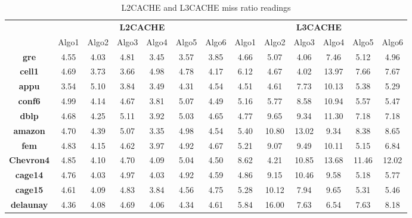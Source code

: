 \begin{table*}[th]
\small
\centering

\begin{tabular}{ c|c|c|c|c|c|c|c|c|c|c|c|c| }
  \cline{2-13}
&
\multicolumn{6}{c}{\textbf{L2CACHE}} &
  \multicolumn{6}{|c}{\textbf{L3CACHE}} \\
  \cline{2-13}
  \multicolumn{1}{c|}{} &
  Algo1 & Algo2 & Algo3 & Algo4 & Algo5 & Algo6 & Algo1 & Algo2 & Algo3 & Algo4 & Algo5 & Algo6\\\hline
  \hline
  \multicolumn{1}{|c|}{\textbf{gre}}
& 4.55 & 4.03 & 4.81 & 3.45 & 3.57 & 3.85 & 4.66 & 5.07 & 4.06 & 7.46 & 5.12 & 4.96 \\ \hline
  \hline
  \multicolumn{1}{|c|}{\textbf{cell1}}
& 4.69 & 3.73 & 3.66 & 4.98 & 4.78 & 4.17 & 6.12 & 4.67 & 4.02 & 13.97 & 7.66 & 7.67\\ \hline
  \hline
  \multicolumn{1}{|c|}{\textbf{appu}}
& 3.54 & 5.10 & 3.84 & 3.49 & 4.31 & 4.54 & 4.51 & 4.61 & 7.73 & 10.13 & 5.38 & 5.29\\ \hline
  \hline
\multicolumn{1}{|c|}{\textbf{conf6}}
& 4.99 & 4.14 & 4.67 & 3.81 & 5.07 & 4.49 & 5.16 & 5.77 & 8.58 & 10.94 & 5.57 & 5.47\\ \hline
  \multicolumn{1}{|c|}{\textbf{dblp}}
& 4.68 & 4.25 & 5.11 & 3.92 & 5.03 & 4.65 & 4.77 & 9.65 & 9.34 & 11.30 & 7.18 & 7.18\\ \hline
  \hline
  \multicolumn{1}{|c|}{\textbf{amazon}}
& 4.70 & 4.39 & 5.07 & 3.35 & 4.98 & 4.54 & 5.40 & 10.80 & 13.02 & 9.34 & 8.38 & 8.65\\ \hline
  \hline
  \multicolumn{1}{|c|}{\textbf{fem}}
& 4.83 & 4.15 & 4.62 & 3.97 & 4.92 & 4.67 & 5.21 & 9.07 & 9.49 & 10.11 & 5.15 & 6.84\\ \hline
  \hline
  \multicolumn{1}{|c|}{\textbf{Chevron4}}
& 4.85 & 4.10 & 4.70 & 4.09 & 5.04 & 4.50 & 8.62 & 4.21 & 10.85 & 13.68 & 11.46 & 12.02\\ \hline
  \hline
  \multicolumn{1}{|c|}{\textbf{cage14}}
& 4.76 & 4.03 & 4.97 & 4.03 & 4.92 & 4.59 & 4.86 & 9.15 & 10.46 & 9.58 & 5.18 & 5.77\\ \hline
  \hline
  \multicolumn{1}{|c|}{\textbf{cage15}}
& 4.61 & 4.09 & 4.83 & 3.84 & 4.56 & 4.75 & 5.28 & 10.12 & 7.94 & 9.65 & 5.31 & 5.46\\ \hline
  \hline
  \multicolumn{1}{|c|}{\textbf{delaunay}}
& 4.36 & 4.08 & 4.69 & 4.06 & 4.34 & 4.61 & 5.84 & 16.00 & 7.63 & 6.54 & 7.63 & 8.18\\ \hline
  \hline
\end{tabular}

\caption{\capfont L2CACHE and L3CACHE miss ratio readings }
\label{tab:table2}
\end{table*}
